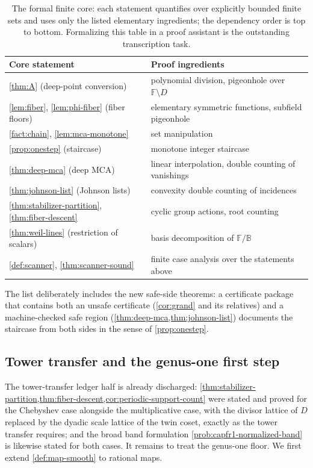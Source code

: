 \documentclass[11pt]{article}
\theoremstyle{definition}
\theoremstyle{remark}
\newcommand{\F}{\mathbb{F}}
\newcommand{\B}{\mathbb{B}}
\begin{document}
\begin{table}[ht]
\centering
\small
\begin{tabular}{@{}ll@{}}
\toprule
Core statement & Proof ingredients \\
\midrule
\cref{thm:A} (deep-point conversion) & polynomial division, pigeonhole over $\F\setminus D$ \\
\cref{lem:fiber}, \cref{lem:phi-fiber} (fiber floors) & elementary symmetric functions, subfield pigeonhole \\
\cref{fact:chain}, \cref{lem:mca-monotone} & set manipulation \\
\cref{prop:onestep} (staircase) & monotone integer staircase \\
\cref{thm:deep-mca} (deep MCA) & linear interpolation, double counting of vanishings \\
\cref{thm:johnson-list} (Johnson lists) & convexity double counting of incidences \\
\cref{thm:stabilizer-partition}, \cref{thm:fiber-descent} & cyclic group actions, root counting \\
\cref{thm:weil-lines} (restriction of scalars) & basis decomposition of $\F/\B$ \\
\cref{def:scanner}, \cref{thm:scanner-sound} & finite case analysis over the statements above \\
\bottomrule
\end{tabular}
\caption{The formal finite core: each statement quantifies over explicitly bounded finite sets and uses only the listed elementary ingredients; the dependency order is top to bottom. Formalizing this table in a proof assistant is the outstanding transcription task.}
\label{tab:core}
\end{table}

The list deliberately includes the new safe-side theorems: a certificate package that contains both an unsafe certificate \textup(\cref{cor:grand} and its relatives\textup) and a machine-checked safe region \textup(\cref{thm:deep-mca,thm:johnson-list}\textup) documents the staircase from both sides in the sense of \cref{prop:onestep}.

\subsection{Tower transfer and the genus-one first step}\label{sec:discharge-T8}

The tower-transfer ledger half is already discharged: \cref{thm:stabilizer-partition,thm:fiber-descent,cor:periodic-support-count} were stated and proved for the Chebyshev case alongside the multiplicative case, with the divisor lattice of $D$ replaced by the dyadic scale lattice of the twin coset, exactly as the tower transfer requires; and the broad band formulation \cref{prob:capfr1-normalized-band} is likewise stated for both cases. It remains to treat the genus-one floor. We first extend \cref{def:map-smooth} to rational maps.
\end{document}
